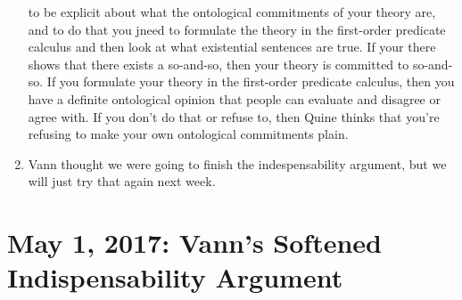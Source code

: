 \documentclass[12pt]{article}
\theoremstyle{definition}
\begin{document}
\begin{enumerate}
        to be explicit about what the ontological commitments of your theory
        are, and to do that you jneed to formulate the theory in the
        first-order predicate calculus and then look at what existential
        sentences are true. If your there shows that there exists a so-and-so,
        then your theory is committed to so-and-so. If you formulate your
        theory in the first-order predicate calculus, then you have a definite
        ontological opinion that people can evaluate and disagree or agree
        with. If you don't do that or refuse to, then Quine thinks that you're
        refusing to make your own ontological commitments plain.
    \item
        Vann thought we were going to finish the indespensability argument, but
        we will just try that again next week.
\end{enumerate}

\section{May 1, 2017: Vann's Softened Indispensability Argument}
\end{document}
